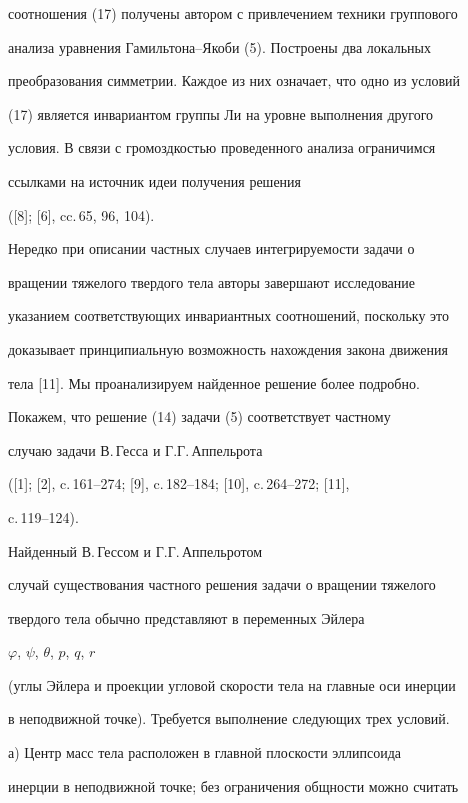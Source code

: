 соотношения (17) получены автором с привлечением техники группового


анализа уравнения Гамильтона--Якоби (5). Построены два локальных


преобразования симметрии. Каждое из них означает, что одно из условий


(17) является инвариантом группы Ли на уровне выполнения другого


условия. В связи с громоздкостью проведенного анализа ограничимся


ссылками на источник идеи получения решения


([8]; [6], cc.\,65, 96, 104).





Нередко при описании частных случаев интегрируемости задачи о


вращении тяжелого твердого тела авторы завершают исследование


указанием соответствующих инвариантных соотношений, поскольку это


доказывает принципиальную возможность нахождения закона движения


тела [11]. Мы проанализируем найденное решение более подробно.





Покажем, что решение (14) задачи (5) соответствует частному


случаю задачи В.\,Гесса и Г.Г.\,Аппельрота


([1]; [2], c.\,161--274; [9], c.\,182--184; [10], c.\,264--272; [11],


c.\,119--124).


Найденный В.\,Гессом и Г.Г.\,Аппельротом


случай существования частного решения задачи о вращении тяжелого


твердого тела обычно представляют в переменных Эйлера


$\varphi$, $\psi$, $\theta$, $p$, $q$, $r$


(углы Эйлера и проекции угловой скорости тела на главные оси инерции


в неподвижной точке). Требуется выполнение следующих трех условий.





а) Центр масс тела расположен в главной плоскости эллипсоида


инерции в неподвижной точке; без ограничения общности можно считать



